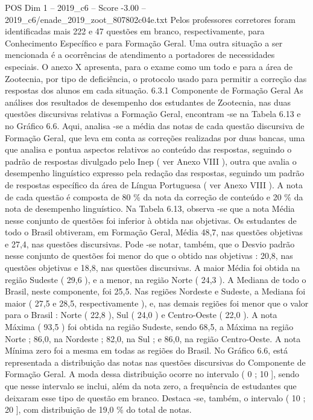 \begin{textsample}{POS Dim 1 – 2019\_c6 – Score -3.00 – 2019\_c6/enade\_2019\_zoot\_807802c04e.txt}
Pelos professores corretores foram identificadas mais 222 e 47 questões em branco, respectivamente, para Conhecimento Específico e para Formação Geral.
Uma outra situação a ser mencionada é a ocorrências de atendimento a portadores de necessidades especiais.
O anexo X apresenta, para o exame como um todo e para a área de Zootecnia, por tipo de deficiência, o protocolo usado para permitir a correção das respostas dos alunos em cada situação. 6.3.1 Componente de Formação Geral As análises dos resultados de desempenho dos estudantes de Zootecnia, nas duas questões discursivas relativas a Formação Geral, encontram -se na Tabela 6.13 e no Gráfico 6.6.
Aqui, analisa -se a média das notas de cada questão discursiva de Formação Geral, que leva em conta as correções realizadas por duas bancas, uma que analisa e pontua aspectos relativos ao conteúdo das respostas, seguindo o padrão de respostas divulgado pelo Inep ( ver Anexo VIII ), outra que avalia o desempenho linguístico expresso pela redação das respostas, seguindo um padrão de respostas específico da área de Língua Portuguesa ( ver Anexo VIII ).
A nota de cada questão é composta de 80 \% da nota da correção de conteúdo e 20 \% da nota de desempenho linguístico.
Na Tabela 6.13, observa -se que a nota Média nesse conjunto de questões foi inferior à obtida nas objetivas.
Os estudantes de todo o Brasil obtiveram, em Formação Geral, Média 48,7, nas questões objetivas e 27,4, nas questões discursivas.
Pode -se notar, também, que o Desvio padrão nesse conjunto de questões foi menor do que o obtido nas objetivas : 20,8, nas questões objetivas e 18,8, nas questões discursivas.
A maior Média foi obtida na região Sudeste ( 29,6 ), e a menor, na região Norte ( 24,3 ).
A Mediana de todo o Brasil, neste componente, foi 25,5.
Nas regiões Nordeste e Sudeste, a Mediana foi maior ( 27,5 e 28,5, respectivamente ), e, nas demais regiões foi menor que o valor para o Brasil : Norte ( 22,8 ), Sul ( 24,0 ) e Centro-Oeste ( 22,0 ).
A nota Máxima ( 93,5 ) foi obtida na região Sudeste, sendo 68,5, a Máxima na região Norte ; 86,0, na Nordeste ; 82,0, na Sul ; e 86,0, na região Centro-Oeste.
A nota Mínima zero foi a mesma em todas as regiões do Brasil.
No Gráfico 6.6, está representada a distribuição das notas nas questões discursivas do Componente de Formação Geral.
A moda dessa distribuição ocorre no intervalo ( 0 ; 10 ], sendo que nesse intervalo se inclui, além da nota zero, a frequência de estudantes que deixaram esse tipo de questão em branco.
Destaca -se, também, o intervalo ( 10 ; 20 ], com distribuição de 19,0 \% do total de notas.

\end{textsample}
